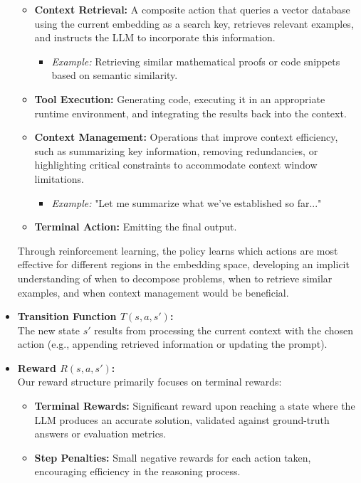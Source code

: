 \documentclass[10pt,journal,compsoc]{IEEEtran}
\begin{document}
\begin{itemize}
\begin{itemize}
  \item
    \textbf{Context Retrieval:} A composite action that queries a vector database using the current embedding as a search key, retrieves relevant examples, and instructs the LLM to incorporate this information.
    \begin{itemize}
    \item \textit{Example:} Retrieving similar mathematical proofs or code snippets based on semantic similarity.
    \end{itemize}
    
  \item
    \textbf{Tool Execution:} Generating code, executing it in an appropriate runtime environment, and integrating the results back into the context.
    
  \item
    \textbf{Context Management:} Operations that improve context efficiency, such as summarizing key information, removing redundancies, or highlighting critical constraints to accommodate context window limitations.
    \begin{itemize}
    \item \textit{Example:} "Let me summarize what we've established so far..."
    \end{itemize}
    
  \item
    \textbf{Terminal Action:} Emitting the final output.
  \end{itemize}

  Through reinforcement learning, the policy learns which actions are most effective for different regions in the embedding space, developing an implicit understanding of when to decompose problems, when to retrieve similar examples, and when context management would be beneficial.
\item
  \textbf{Transition Function $T(s,a,s')$:}\\
  The new state $s'$ results from processing the current context with
  the chosen action (e.g., appending retrieved information or updating
  the prompt).
\item
  \textbf{Reward $R(s,a,s')$:}\\
  Our reward structure primarily focuses on terminal rewards:
  \begin{itemize}
    \item \textbf{Terminal Rewards:} Significant reward upon reaching a state where the LLM produces an accurate solution, validated against ground-truth answers or evaluation metrics.
    \item \textbf{Step Penalties:} Small negative rewards for each action taken, encouraging efficiency in the reasoning process.
  \end{itemize}
  

\end{itemize}
\end{document}
